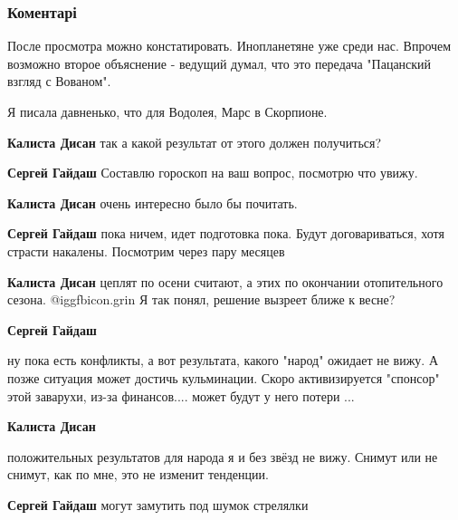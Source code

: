  
 
 
 
 
\subsubsection{Коментарі}

\begin{itemize} %

После просмотра можно констатировать. Инопланетяне уже среди нас. Впрочем
возможно второе объяснение - ведущий думал, что это передача "Пацанский взгляд
с Вованом".

Я писала давненько, что для Водолея,
Марс в Скорпионе.

\begin{itemize} %
\textbf{Калиста Дисан} так а какой результат от этого должен получиться?

\textbf{Сергей Гайдаш} Составлю гороскоп на ваш вопрос, посмотрю что увижу.

\textbf{Калиста Дисан} очень интересно было бы почитать.

\textbf{Сергей Гайдаш} пока ничем, идет подготовка пока. Будут договариваться, хотя страсти накалены. Посмотрим через пару месяцев

\textbf{Калиста Дисан} цеплят по осени считают, а этих по окончании отопительного сезона.  @igg{fbicon.grin}  Я так понял, решение вызреет ближе к весне?

\textbf{Сергей Гайдаш} 

ну пока есть конфликты, а вот результата, какого "народ" ожидает не вижу. А
позже ситуация может достичь кульминации. Скоро активизируется "спонсор" этой
заварухи, из-за финансов.... может будут у него потери ...

\textbf{Калиста Дисан} 

положительных результатов для народа я и без звёзд не вижу. Снимут или не
снимут, как по мне, это не изменит тенденции.

\textbf{Сергей Гайдаш} могут замутить под шумок стрелялки


\end{itemize}
\end{itemize}
